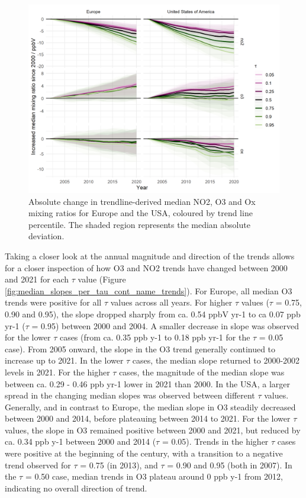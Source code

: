 \documentclass[journal abbreviation, manuscript]{copernicus}
\begin{document}
\begin{figure}[h!]
\includegraphics[width=12cm]{plots/fixed_median_slopes_per_tau_continent_name_absolute_change_with_mad_ribbon.png}
\caption{Absolute change in trendline-derived median NO2, O3 and Ox mixing ratios for Europe and the USA, coloured by trend line percentile. The shaded region represents the median absolute deviation.}
\label{fig:median_slopes_per_tau_cont_name_absolute}
\end{figure}

Taking a closer look at the annual magnitude and direction of the trends allows for a closer inspection of how O3 and NO2 trends have changed between 2000 and 2021 for each $\tau$ value (Figure \ref{fig:median_slopes_per_tau_cont_name_trends}). For Europe, all median O3 trends were positive for all $\tau$ values across all years. For higher $\tau$ values ($\tau$ = 0.75, 0.90 and 0.95), the slope dropped sharply from ca. 0.54 ppbV yr-1 to ca 0.07 ppb yr-1 ($\tau$ = 0.95) between 2000 and 2004. A smaller decrease in slope was observed for the lower $\tau$ cases (from ca. 0.35 ppb y-1 to 0.18 ppb yr-1 for the $\tau$ = 0.05 case). From 2005 onward, the slope in the O3 trend generally continued to increase up to 2021. In the lower $\tau$ cases, the median slope returned to 2000-2002 levels in 2021. For the higher $\tau$ cases, the magnitude of the median slope was between ca. 0.29 - 0.46 ppb yr-1 lower in 2021 than 2000. In the USA, a larger spread in the changing median slopes was observed between different $\tau$ values. Generally, and in contrast to Europe, the median slope in O3 steadily decreased between 2000 and 2014, before plateauing between 2014 to 2021. For the lower $\tau$ values, the slope in O3 remained positive between 2000 and 2021, but reduced by ca. 0.34 ppb y-1 between 2000 and 2014 ($\tau$ = 0.05). Trends in the higher $\tau$ cases were positive at the beginning of the century, with a transition to a negative trend observed for $\tau$ = 0.75 (in 2013), and $\tau$ = 0.90 and 0.95 (both in 2007). In the $\tau$ = 0.50 case, median trends in O3 plateau around 0 ppb y-1 from 2012, indicating no overall direction of trend.
\end{document}
